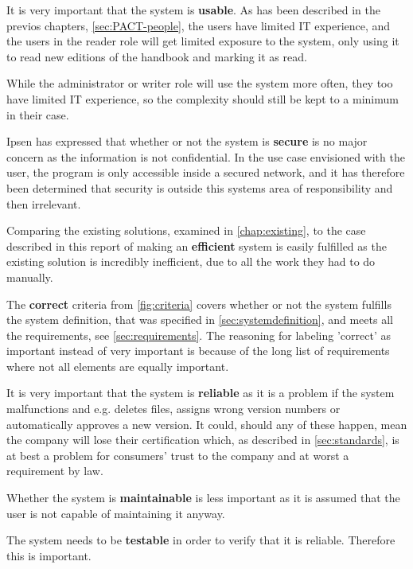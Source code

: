 \documentclass[../../master.tex]{subfiles}
\begin{document}
It is very important that the system is \textbf{usable}.
As has been described in the previos chapters, \cref{sec:PACT-people}, the users have limited IT experience, and the users in the reader role will get limited exposure to the system, only using it to read new editions of the handbook and marking it as read.

While the administrator or writer role will use the system more often, they too have limited IT experience, so the complexity should still be kept to a minimum in their case.

Ipsen has expressed that whether or not the system is \textbf{secure} is no major concern as the information is not confidential.
In the use case envisioned with the user, the program is only accessible inside a secured network, and it has therefore been determined that security is outside this systems area of responsibility and then irrelevant.

Comparing the existing solutions, examined in \cref{chap:existing}, to the case described in this report of making an \textbf{efficient} system is easily fulfilled as the existing solution is incredibly inefficient, due to all the work they had to do manually.

The \textbf{correct} criteria from \cref{fig:criteria} covers whether or not the system fulfills the system definition, that was specified in \cref{sec:systemdefinition}, and meets all the requirements, see \cref{sec:requirements}.
The reasoning for labeling 'correct' as important instead of very important is because of the long list of requirements where not all elements are equally important.

It is very important that the system is \textbf{reliable} as it is a problem if the system malfunctions and e.g. deletes files, assigns wrong version numbers or automatically approves a new version.
It could, should any of these happen, mean the company will lose their certification which, as described in \cref{sec:standards}, is at best a problem for consumers' trust to the company and at worst a requirement by law.

Whether the system is \textbf{maintainable} is less important as it is assumed that the user is not capable of maintaining it anyway.

The system needs to be \textbf{testable} in order to verify that it is reliable.
Therefore this is important.
\end{document}
